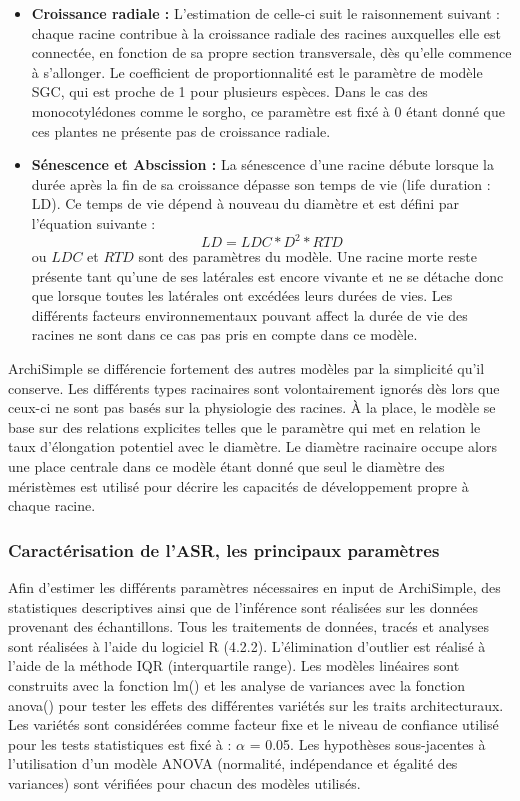 \begin{itemize}
    \item \textbf{Croissance radiale :}
    L'estimation de celle-ci suit le raisonnement suivant :
    chaque racine contribue à la croissance radiale des racines auxquelles elle est connectée, en fonction de sa propre section transversale, dès qu'elle commence à s'allonger. 
    Le coefficient de proportionnalité est le paramètre de modèle SGC, qui est proche de 1 pour plusieurs espèces.
    Dans le cas des monocotylédones comme le sorgho, ce paramètre est fixé à 0 étant donné que ces plantes ne présente pas de croissance radiale.
    \item \textbf{Sénescence et Abscission :}
    La sénescence d'une racine débute lorsque la durée après la fin de sa croissance dépasse son temps de vie (life duration : LD).
    Ce temps de vie dépend à nouveau du diamètre et est défini par l'équation suivante :
    \begin{equation} 
    LD=LDC*D^2*RTD 
    \label{eq:LD}
    \end{equation}
    ou $LDC$ et $RTD$ sont des paramètres du modèle.
    Une racine morte reste présente tant qu'une de ses latérales est encore vivante et ne se détache donc que lorsque toutes les latérales ont excédées leurs durées de vies.
    Les différents facteurs environnementaux pouvant affect la durée de vie des racines ne sont dans ce cas pas pris en compte dans ce modèle.
\end{itemize}

ArchiSimple se différencie fortement des autres modèles par la simplicité qu'il conserve.
Les différents types racinaires sont volontairement ignorés dès lors que ceux-ci ne sont pas basés sur la physiologie des racines.
À la place, le modèle se base sur des relations explicites telles que le paramètre qui met en relation le taux d'élongation potentiel avec le diamètre.
Le diamètre racinaire occupe alors une place centrale dans ce modèle étant donné que seul le diamètre des méristèmes est utilisé pour décrire les capacités de développement propre à chaque racine.

\subsubsection{Caractérisation de l'ASR, les principaux paramètres}

Afin d'estimer les différents paramètres nécessaires en input de ArchiSimple, des statistiques descriptives ainsi que de l'inférence sont réalisées sur les données provenant des échantillons.
Tous les traitements de données, tracés et analyses sont réalisées à l'aide du logiciel R (4.2.2).
L'élimination d'outlier est réalisé à l'aide de la méthode IQR (interquartile range).
Les modèles linéaires sont construits avec la fonction lm() et les analyse de variances avec la fonction anova() pour tester les effets des différentes variétés sur les traits architecturaux.
Les variétés sont considérées comme facteur fixe et le niveau de confiance utilisé pour les tests statistiques est fixé à : $\alpha$ = 0.05.
Les hypothèses sous-jacentes à l'utilisation d'un modèle ANOVA (normalité, indépendance et égalité des variances) sont vérifiées pour chacun des modèles utilisés.
\newline

